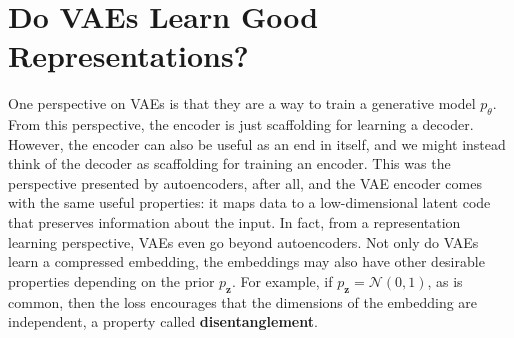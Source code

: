 



\section{Do VAEs Learn Good Representations?}

One perspective on VAEs is that they are a way to train a generative model $p_{\theta}$. From this perspective, the encoder is just scaffolding for learning a decoder. However, the encoder can also be useful as an end in itself, and we might instead think of the decoder as scaffolding for training an encoder. This was the perspective presented by autoencoders, after all, and the VAE encoder comes with the same useful properties: it maps data to a low-dimensional latent code that preserves information about the input. In fact, from a representation learning perspective, VAEs even go beyond autoencoders. Not only do VAEs learn a compressed embedding, the embeddings may also have other desirable properties depending on the prior $p_{\mathbf{z}}$. For example, if $p_{\mathbf{z}} = \mathcal{N}(0,1)$, as is common, then the loss encourages that the dimensions of the embedding are independent, a property called \textbf{disentanglement}.%

